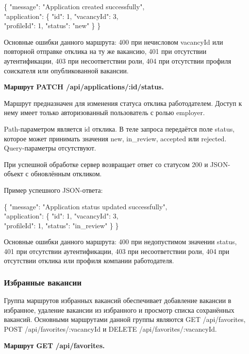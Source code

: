 \begin{flushleft}
	\small\ttfamily
	\{ "message": "Application created successfully",\\
	"application": \{ "id": 1, "vacancyId": 3,\\
	"profileId": 1, "status": "new" \} \}
\end{flushleft}

Основные ошибки данного маршрута: 400 при нечисловом vacancyId или повторной отправке отклика на ту же вакансию, 401 при отсутствии аутентификации, 403 при несоответствии роли, 404 при отсутствии профиля соискателя или опубликованной вакансии.

\textbf{Маршрут PATCH /api/applications/:id/status.}

Маршрут предназначен для изменения статуса отклика работодателем. Доступ к нему имеет только авторизованный пользователь с ролью employer.

Path-параметром является id отклика. В теле запроса передаётся поле status, которое может принимать значения new, in\_review, accepted или rejected. Query-параметры отсутствуют.

При успешной обработке сервер возвращает ответ со статусом 200 и JSON-объект с обновлённым откликом.

Пример успешного JSON-ответа:

\begin{flushleft}
	\small\ttfamily
	\{ "message": "Application status updated successfully",\\
	"application": \{ "id": 1, "vacancyId": 3,\\
	"profileId": 1, "status": "in\_review" \} \}
\end{flushleft}

Основные ошибки данного маршрута: 400 при недопустимом значении status, 401 при отсутствии аутентификации, 403 при несоответствии роли, 404 при отсутствии отклика или профиля компании работодателя.

\subsubsection{Избранные вакансии}

Группа маршрутов избранных вакансий обеспечивает добавление вакансии в избранное, удаление вакансии из избранного и просмотр списка сохранённых вакансий. Основными маршрутами данной группы являются GET /api/favorites, POST /api/favorites/:vacancyId и DELETE /api/favorites/:vacancyId.

\textbf{Маршрут GET /api/favorites.}

